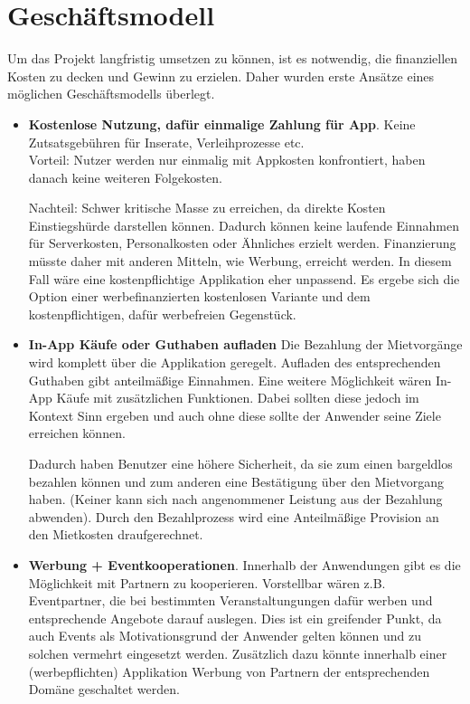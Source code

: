 
\chapter{Geschäftsmodell}

Um das Projekt langfristig umsetzen zu können, ist es notwendig, die finanziellen Kosten zu decken und Gewinn zu erzielen. 
Daher wurden erste Ansätze eines möglichen Geschäftsmodells überlegt.

\begin{itemize}
   \item \textbf{Kostenlose Nutzung, dafür einmalige Zahlung für App}. Keine Zutsatsgebühren für Inserate, Verleihprozesse etc.\\
   Vorteil: Nutzer werden nur einmalig mit Appkosten konfrontiert, haben danach keine weiteren Folgekosten.

   Nachteil: Schwer kritische Masse zu erreichen, da direkte Kosten Einstiegshürde darstellen können. Dadurch können keine laufende Einnahmen für Serverkosten, Personalkosten oder Ähnliches erzielt werden. Finanzierung müsste daher mit anderen Mitteln, wie Werbung, erreicht werden. In diesem Fall wäre eine kostenpflichtige Applikation eher unpassend. Es ergebe sich die Option einer werbefinanzierten kostenlosen Variante und dem kostenpflichtigen, dafür werbefreien Gegenstück.\\


   \item \textbf{In-App Käufe oder Guthaben aufladen} 
   Die Bezahlung der Mietvorgänge wird komplett über die Applikation geregelt. Aufladen des entsprechenden Guthaben gibt anteilmäßige Einnahmen. Eine weitere Möglichkeit wären In-App Käufe mit zusätzlichen Funktionen. Dabei sollten diese jedoch im Kontext Sinn ergeben und auch ohne diese sollte der Anwender seine Ziele erreichen können. 
   
   Dadurch haben Benutzer eine höhere Sicherheit, da sie zum einen bargeldlos bezahlen können und zum anderen eine Bestätigung über den Mietvorgang haben. (Keiner kann sich nach angenommener Leistung aus der Bezahlung abwenden). Durch den Bezahlprozess wird eine Anteilmäßige Provision an den Mietkosten draufgerechnet. 
\\

   \item \textbf{Werbung + Eventkooperationen}.
   Innerhalb der Anwendungen gibt es die Möglichkeit mit Partnern zu kooperieren. Vorstellbar wären z.B. Eventpartner, die bei bestimmten Veranstaltungungen dafür werben und entsprechende Angebote darauf auslegen. Dies ist ein greifender Punkt, da auch Events als Motivationsgrund der Anwender gelten können und zu solchen vermehrt eingesetzt werden. Zusätzlich dazu könnte innerhalb einer (werbepflichten) Applikation Werbung von Partnern der entsprechenden Domäne geschaltet werden.

\end{itemize}


